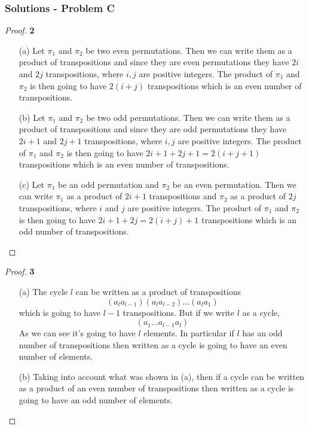 \documentclass[11pt]{article}
\begin{document}
	\subsubsection*{Solutions - Problem C}
		\begin{proof}{\textbf{2}}
			\begin{itemize}
				\item[(a)] Let $\pi_1$ and $\pi_2$ be two even permutations. Then we can write them as a product of transpositions and since they are even permutations they have $2i$ and $2j$ transpositions, where $i,j$ are positive integers. The product of $\pi_1$ and $\pi_2$ is then going to have $2(i+j)$ transpositions which is an even number of transpositions.
				\item[(b)] Let $\pi_1$ and $\pi_2$ be two odd permutations. Then we can write them as a product of transpositions and since they are odd permutations they have $2i+1$ and $2j+1$ transpositions, where $i,j$ are positive integers. The product of $\pi_1$ and $\pi_2$ is then going to have $2i+1+2j+1=2(i+j+1)$ transpositions which is an even number of transpositions.
				\item[(c)] Let $\pi_1$ be an odd permutation and $\pi_2$ be an even permutation. Then we can write $\pi_1$ as a product of $2i+1$ transpositions and $\pi_2$ as a product of $2j$ transpositions, where $i$ and $j$ are positive integers. The product of $\pi_1$ and $\pi_2$ is then going to have $2i+1+2j=2(i+j)+1$ transpositions which is an odd number of transpositions.
			\end{itemize}
		\end{proof}
		\begin{proof}{\textbf{3}}
			\begin{itemize}
				\item [(a)] The cycle $l$ can be written as a product of
				transpositions
				$$(a_la_{l-1})(a_la_{l-2}) \dots (a_la_1)$$
				which is going to have $l-1$ transpositions. But if we write $l$
				as a cycle,
				$$(a_1 \dots a_{l-1}a_l)$$
				As we can see it's going to have $l$ elements. In particular if
				$l$ has an odd number of transpositions then written as a cycle
				is going to have an even number of elements. 
   				\item [(b)] Taking into account what was shown in (a), then if
				a cycle can be written as a product of an even number of
				transpositions then written as a cycle is going to have an odd
				number of elements.
 			\end{itemize}
		\end{proof}
\end{document}
